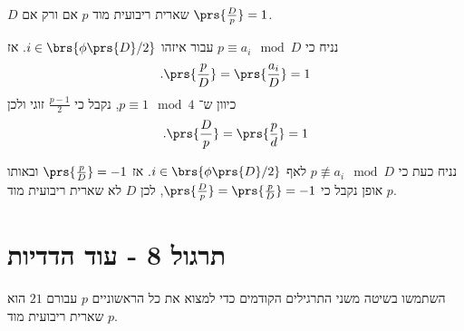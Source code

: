 \documentclass[a4paper,10pt,twoside,openany]{book}
\begin{document}
\begin{solution}
$D$
שארית ריבועית מוד
$p$
אם ורק אם
$\prs{\frac{D}{p}} = 1$.

נניח כי
$p \equiv a_i \mod{D}$
עבור איזהו
$i \in \brs{\phi\prs{D} / 2}$.
אז
\begin{align*}
\text{.} \prs{\frac{p}{D}} = \prs{\frac{a_i}{D}} = 1
\end{align*}
כיוון ש־%
$p \equiv 1 \mod{4}$,
נקבל כי
$\frac{p-1}{2}$
זוגי ולכן
\begin{align*}
\text{.} \prs{\frac{D}{p}} = \prs{\frac{p}{d}} = 1
\end{align*}

נניח כעת כי
$p \not\equiv a_i \mod{D}$
לאף
$i \in \brs{\phi\prs{D}/2}$.
אז
$\prs{\frac{p}{D}} = -1$
ובאותו אופן נקבל כי
$\prs{\frac{D}{p}} = \prs{\frac{p}{D}} = -1$,
לכן
$D$
לא שארית ריבועית מוד
$p$.
\end{solution}

\chapter{תרגול 8 - עוד הדדיות}

\begin{exercisechap}
השתמשו בשיטה משני התרגילים הקודמים כדי למצוא את כל הראשוניים
$p$
עבורם
$21$
הוא שארית ריבועית מוד
$p$.
\end{exercisechap}
\end{document}
